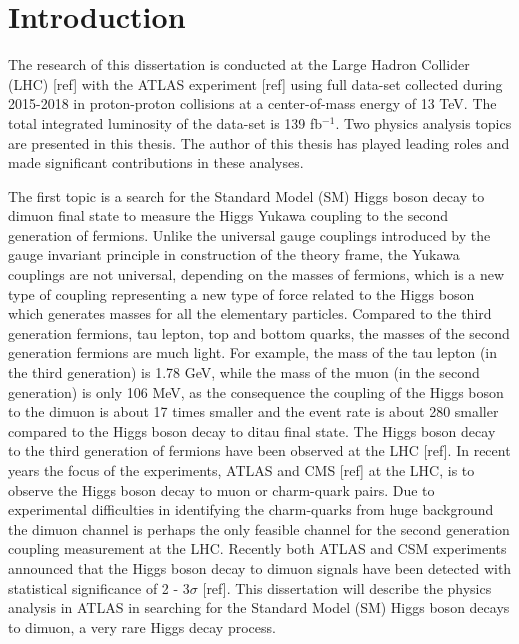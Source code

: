 \chapter{Introduction}

 The research of this dissertation is conducted at the Large Hadron Collider (LHC) [ref] with the ATLAS experiment [ref] using full data-set collected 
 during 2015-2018 in proton-proton collisions at a center-of-mass energy of 13 TeV.  The total integrated luminosity of the data-set is 139 fb$^{-1}$. 
 Two physics analysis topics are presented in this thesis. The author of this thesis has played leading roles and made significant contributions in these analyses.
 
 The first topic is a search for the Standard Model (SM) Higgs boson decay to dimuon final state to measure the Higgs Yukawa coupling to the second generation of fermions. 
 Unlike the universal gauge couplings introduced by the gauge invariant principle in construction of the theory frame, the Yukawa couplings are not universal, depending on the masses of fermions, which is a new type of coupling representing a new type of force related to the Higgs boson which generates masses for all the elementary particles. Compared to the third generation fermions, tau lepton, top and bottom quarks, the masses of the second generation fermions are much light. For example, the mass of the tau lepton (in the third generation) is 1.78 GeV, while the mass of the muon (in the second generation) is only 106 MeV, as the consequence the coupling of the Higgs boson to the dimuon is about 17 times smaller and the event rate is about 280 smaller compared to the Higgs boson decay to ditau final state. The Higgs boson decay to the third generation of fermions have been observed at the LHC [ref]. In recent years the focus of the experiments, ATLAS and CMS [ref] at the LHC, is to observe the Higgs boson decay to muon or charm-quark pairs. Due to experimental difficulties in identifying the charm-quarks from huge background the dimuon channel is perhaps the only feasible channel for the second generation coupling measurement at the LHC. 
 Recently both ATLAS and CSM experiments announced that the Higgs boson decay to dimuon signals have been detected with statistical significance of 2 - 3$\sigma$ [ref]. This dissertation will describe the physics analysis in ATLAS in searching for the Standard Model (SM) Higgs boson decays to dimuon, a very rare Higgs decay process.
 
